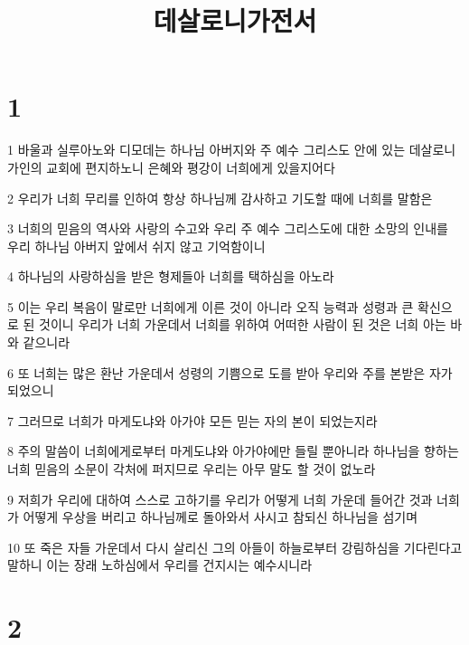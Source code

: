

\title{데살로니가전서}


\chapter{1}

\par 1 바울과 실루아노와 디모데는 하나님 아버지와 주 예수 그리스도 안에 있는 데살로니가인의 교회에 편지하노니 은혜와 평강이 너희에게 있을지어다
\par 2 우리가 너희 무리를 인하여 항상 하나님께 감사하고 기도할 때에 너희를 말함은
\par 3 너희의 믿음의 역사와 사랑의 수고와 우리 주 예수 그리스도에 대한 소망의 인내를 우리 하나님 아버지 앞에서 쉬지 않고 기억함이니
\par 4 하나님의 사랑하심을 받은 형제들아 너희를 택하심을 아노라
\par 5 이는 우리 복음이 말로만 너희에게 이른 것이 아니라 오직 능력과 성령과 큰 확신으로 된 것이니 우리가 너희 가운데서 너희를 위하여 어떠한 사람이 된 것은 너희 아는 바와 같으니라
\par 6 또 너희는 많은 환난 가운데서 성령의 기쁨으로 도를 받아 우리와 주를 본받은 자가 되었으니
\par 7 그러므로 너희가 마게도냐와 아가야 모든 믿는 자의 본이 되었는지라
\par 8 주의 말씀이 너희에게로부터 마게도냐와 아가야에만 들릴 뿐아니라 하나님을 향하는 너희 믿음의 소문이 각처에 퍼지므로 우리는 아무 말도 할 것이 없노라
\par 9 저희가 우리에 대하여 스스로 고하기를 우리가 어떻게 너희 가운데 들어간 것과 너희가 어떻게 우상을 버리고 하나님께로 돌아와서 사시고 참되신 하나님을 섬기며
\par 10 또 죽은 자들 가운데서 다시 살리신 그의 아들이 하늘로부터 강림하심을 기다린다고 말하니 이는 장래 노하심에서 우리를 건지시는 예수시니라

\chapter{2}


